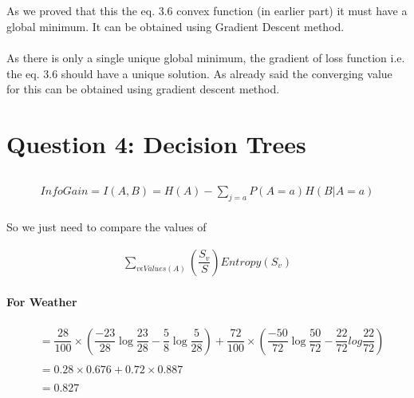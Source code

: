\documentclass[paper=a4, fontsize=11pt]{scrartcl} %
\numberwithin{equation}{section} %
\numberwithin{figure}{section} %
\numberwithin{table}{section} %
\begin{document}
\subsection{}
As we proved that this the eq. 3.6 convex function (in earlier part) it must have a global minimum. It can be obtained using Gradient Descent method.\\\\
As there is only a single unique global minimum, the gradient of loss function i.e. the eq. 3.6 should have a unique solution. As already said the converging value for this can be obtained using gradient descent method.

\section{Question 4: Decision Trees}
\subsection{}

\begin{align*} 
InfoGain = I(A,B) = H(A) - \sum_{j=a}^{}P(A=a)H(B|A=a)
\end{align*}
\paragraph{}
So we just need to compare the values of 

\begin{align*} 
\sum_{v \epsilon Values(A)}^{}(\dfrac{S_{v}}{S}) Entropy(S_{v})
\end{align*}

\paragraph{For Weather}
\begin{align*} 
&= \dfrac{28}{100} \times (\dfrac{-23}{28}\log\dfrac{23}{28} - \dfrac{5}{8}\log\dfrac{5}{28}) + \dfrac{72}{100} \times (\dfrac{-50}{72}\log\dfrac{50}{72}-\dfrac{22}{72}log\dfrac{22}{72})\\\\
&= 0.28 \times 0.676 + 0.72 \times 0.887 \\\\
&= 0.827
\end{align*}
\end{document}
